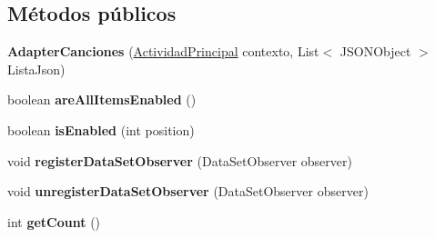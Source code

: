\subsection*{Métodos públicos}
\begin{DoxyCompactItemize}
\item 
\mbox{\label{classcom_1_1example_1_1mediaio_1_1mediaio_1_1modelo_1_1_adapter_canciones_a28ed701a3b734c5759bfc837b83f3b01}} 
{\bfseries Adapter\+Canciones} (\hyperlink{classcom_1_1example_1_1mediaio_1_1mediaio_1_1_actividades_1_1_actividad_principal}{Actividad\+Principal} contexto, List$<$ J\+S\+O\+N\+Object $>$ Lista\+Json)
\item 
\mbox{\label{classcom_1_1example_1_1mediaio_1_1mediaio_1_1modelo_1_1_adapter_canciones_a96d95fa7357b3d9d7c8bb7ac2bdf8718}} 
boolean {\bfseries are\+All\+Items\+Enabled} ()
\item 
\mbox{\label{classcom_1_1example_1_1mediaio_1_1mediaio_1_1modelo_1_1_adapter_canciones_aa7bb61883df6d97f3a32fa6ef9e4e14e}} 
boolean {\bfseries is\+Enabled} (int position)
\item 
\mbox{\label{classcom_1_1example_1_1mediaio_1_1mediaio_1_1modelo_1_1_adapter_canciones_a35495abacaae971fe3bea0f1b07ec0e5}} 
void {\bfseries register\+Data\+Set\+Observer} (Data\+Set\+Observer observer)
\item 
\mbox{\label{classcom_1_1example_1_1mediaio_1_1mediaio_1_1modelo_1_1_adapter_canciones_ac8c0877acc1913e5bea2aa11716de4d7}} 
void {\bfseries unregister\+Data\+Set\+Observer} (Data\+Set\+Observer observer)
\item 
\mbox{\label{classcom_1_1example_1_1mediaio_1_1mediaio_1_1modelo_1_1_adapter_canciones_ab01efefa426809c3a9500d4c98f9edbb}} 
int {\bfseries get\+Count} ()
\item 
\mbox{\label{classcom_1_1example_1_1mediaio_1_1mediaio_1_1modelo_1_1_adapter_canciones_ac9526f08df06a74b4bf03ca997cc1281}} 

\end{DoxyCompactItemize}
